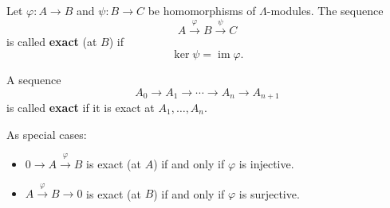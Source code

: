 Let $\varphi : A \to B$ and $\psi : B \to C$ be homomorphisms of $\Lambda$-modules. The sequence
$$A \xrightarrow{\varphi} B \xrightarrow{\psi} C$$
is called \textbf{exact} (at $B$) if
$$\ker \psi = \operatorname{im} \varphi.$$

A sequence
$$A_0 \to A_1 \to \cdots \to A_n \to A_{n+1}$$
is called \textbf{exact} if it is exact at $A_1, \ldots, A_n$.

As special cases:
\begin{itemize}
  \item[(a)] $0 \to A \xrightarrow{\varphi} B$ is exact (at $A$) if and only if $\varphi$ is injective.
  \item[(b)] $A \xrightarrow{\varphi} B \to 0$ is exact (at $B$) if and only if $\varphi$ is surjective.
\end{itemize}
